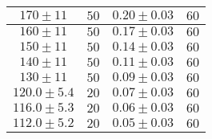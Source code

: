 \documentclass[@MAIN@]{subfile}
\begin{document}
\begin{tabular}{ ||c|c|c|c|| }
        \hline
        $170\pm 11$        & $50$                 & $0.20\pm 0.03$  & $60$             \\
        \hline
        $160\pm 11$        & $50$                 & $0.17\pm 0.03$  & $60$             \\
        \hline
        $150\pm 11$        & $50$                 & $0.14\pm 0.03$  & $60$             \\
        \hline
        $140\pm 11$        & $50$                 & $0.11\pm 0.03$  & $60$             \\
        \hline
        $130\pm 11$        & $50$                 & $0.09\pm 0.03$ & $60$             \\
        \hline
        $120.0\pm 5.4$     & $20$                 & $0.07\pm 0.03$  & $60$             \\
        \hline
        $116.0\pm 5.3$     & $20$                 & $0.06\pm 0.03$  & $60$             \\
        \hline
        $112.0\pm 5.2$     & $20$                 & $0.05\pm 0.03$  & $60$             \\
        \hline

    \end{tabular}
\end{document}
